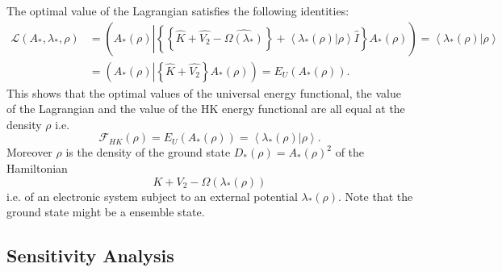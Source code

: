\documentclass[aps,preprint]{revtex4}%
\begin{document}
The optimal value of the Lagrangian satisfies the following identities:
\begin{align}
\mathcal{L}\left(  A_{\ast},\lambda_{\ast},\rho\right)   &  =\left(  A_{\ast
}\left(  \rho\right)  \left\vert \left\{  \left\{  \widehat{K}+\widehat{V_{2}%
}-\widehat{\Omega\left(  \lambda_{\ast}\right)  }\right\}  +\left\langle
\left.  \lambda_{\ast}\left(  \rho\right)  \right\vert \rho\right\rangle
\hat{I}\right\}  \right.  A_{\ast}\left(  \rho\right)  \right)  =\left\langle
\left.  \lambda_{\ast}\left(  \rho\right)  \right\vert \rho\right\rangle
\nonumber\\
&  =\left(  A_{\ast}\left(  \rho\right)  \left\vert \left\{  \widehat
{K}+\widehat{V_{2}}\right\}  \right.  A_{\ast}\left(  \rho\right)  \right)
=E_{U}\left(  A_{\ast}\left(  \rho\right)  \right)  .
\end{align}
This shows that the optimal values of the universal energy functional, the
value of the Lagrangian and the value of the HK energy functional are all
equal at the density $\rho$ i.e.
\begin{equation}
\mathcal{F}_{HK}\left(  \rho\right)  =E_{U}\left(  A_{\ast}\left(
\rho\right)  \right)  =\left\langle \left.  \lambda_{\ast}\left(  \rho\right)
\right\vert \rho\right\rangle .
\end{equation}
Moreover $\rho$ is the density of the ground state $D_{\ast}\left(
\rho\right)  =A_{\ast}\left(  \rho\right)  ^{2}$ of the Hamiltonian
\begin{equation}
K+V_{2}-\Omega\left(  \lambda_{\ast}\left(  \rho\right)  \right)
\end{equation}
i.e. of an electronic system subject to an external potential $\lambda_{\ast
}\left(  \rho\right)  $. Note that the ground state might be a ensemble state.

\subsection{Sensitivity Analysis\label{SenAnal}}
\end{document}
